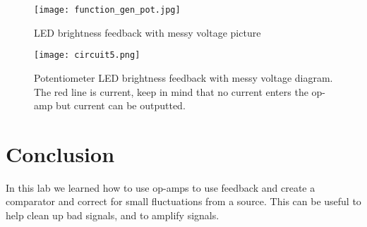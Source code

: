 \documentclass[prl,12pt,notitlepage,aps,onecolumn,superscriptaddress]{revtex4-1}
\begin{document}
\begin{figure}[H]
\begin{center}
\texttt{[image: function\_gen\_pot.jpg]}
\end{center}
\caption{\label{fig:pic} LED brightness feedback with messy voltage picture}
\end{figure}

\begin{figure}[H]
\begin{center}
\texttt{[image: circuit5.png]}
\end{center}
\caption{\label{fig:pic} Potentiometer LED brightness feedback with messy voltage diagram. The red line is current, keep in mind that no current enters the op-amp but current can be outputted.}
\end{figure}

\section{Conclusion}
In this lab we learned how to use op-amps to use feedback and create a comparator and correct for small fluctuations from a source. This can be useful to help clean up bad signals, and to amplify signals.
\end{document}
